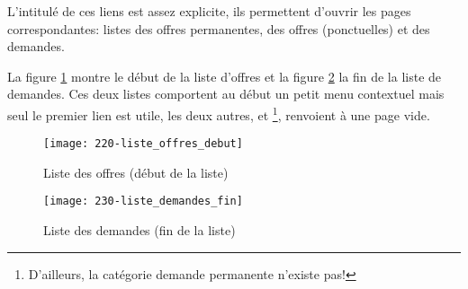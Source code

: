 L'intitulé de ces liens est assez explicite, ils permettent d’ouvrir les pages correspondantes: listes des offres permanentes, des offres (ponctuelles) et des demandes. 


La figure \ref{fig:offresDebut} montre le début de la liste d’offres et la figure \ref{fig:demandesFin} la fin de la liste de demandes. Ces deux listes comportent au début un petit menu contextuel mais seul le premier lien  est utile, les deux autres,  et %
\footnote{D'ailleurs, la catégorie demande permanente n'existe pas!},
renvoient à une page vide.
\begin{figure}
    \texttt{[image: 220-liste\_offres\_debut]}
    \caption[Liste des offres]{Liste des offres (début de la liste)}
    \label{fig:offresDebut}
\end{figure}
\begin{figure}
    \texttt{[image: 230-liste\_demandes\_fin]}
    \caption[Liste des demandes]{Liste des demandes (fin de la liste)}
    \label{fig:demandesFin}
\end{figure}

